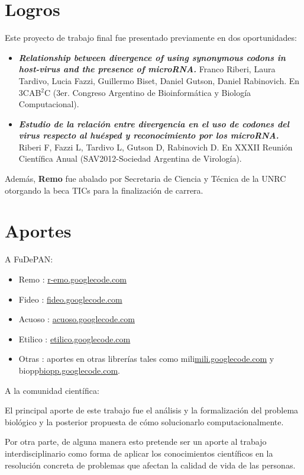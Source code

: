 \section{Logros}
Este proyecto de trabajo final fue presentado previamente en dos oportunidades:
\begin{itemize}
    \item \emph{\textbf{Relationship between divergence of using synonymous codons in host-virus and the presence of microRNA.}} Franco	Riberi, Laura Tardivo, Lucia Fazzi, Guillermo Biset, Daniel Gutson, Daniel Rabinovich. En 3CAB$^{2}$C (3er. Congreso Argentino de Bioinformática y Biología Computacional).

    \item \emph{\textbf{Estudio de la relación entre divergencia  en el uso de codones del virus respecto al huésped y reconocimiento por los microRNA.}} Riberi F, Fazzi L, Tardivo L, Gutson D, Rabinovich D. En XXXII Reunión Científica Anual (SAV2012-Sociedad Argentina de Virología).    
\end{itemize}

Además, \textbf{Remo} fue abalado por Secretaria de Ciencia y Técnica de la UNRC otorgando la beca TICs para la finalización de carrera.

\section{Aportes}
\par A FuDePAN:
\begin{itemize}
    \item Remo   : \url{r-emo.googlecode.com}
    \item Fideo   : \url{fideo.googlecode.com}
    \item Acuoso  : \url{acuoso.googlecode.com}
    \item Etilico : \url{etilico.googlecode.com}
    \item Otras   : aportes en otras librerías tales como mili\url{mili.googlecode.com} y biopp\url{biopp.googlecode.com}.
\end{itemize}

\par A la comunidad científica:
\par El principal aporte de este trabajo fue el análisis y la formalización del
problema biológico y la posterior propuesta de cómo solucionarlo
computacionalmente. 

\par Por otra parte, de alguna manera esto pretende ser un aporte al trabajo interdisciplinario como forma de aplicar los conocimientos científicos en la resolución concreta de problemas que afectan la calidad de vida de las personas.

